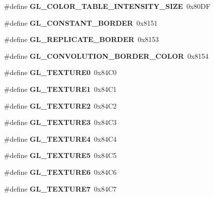 \begin{DoxyCompactItemize}
\item 
\#define {\bfseries G\+L\+\_\+\+C\+O\+L\+O\+R\+\_\+\+T\+A\+B\+L\+E\+\_\+\+I\+N\+T\+E\+N\+S\+I\+T\+Y\+\_\+\+S\+I\+Z\+E}~0x80\+D\+F\label{_s_d_l__opengl_8h_a4a290871d9e2f9022dd8e964d78bdbdb}

\item 
\#define {\bfseries G\+L\+\_\+\+C\+O\+N\+S\+T\+A\+N\+T\+\_\+\+B\+O\+R\+D\+E\+R}~0x8151\label{_s_d_l__opengl_8h_a753677dedf883b38fa6c5502b17c4e93}

\item 
\#define {\bfseries G\+L\+\_\+\+R\+E\+P\+L\+I\+C\+A\+T\+E\+\_\+\+B\+O\+R\+D\+E\+R}~0x8153\label{_s_d_l__opengl_8h_aa9566ae6ab500f9fcc95d0a0a95d7b2c}

\item 
\#define {\bfseries G\+L\+\_\+\+C\+O\+N\+V\+O\+L\+U\+T\+I\+O\+N\+\_\+\+B\+O\+R\+D\+E\+R\+\_\+\+C\+O\+L\+O\+R}~0x8154\label{_s_d_l__opengl_8h_a161f3ba1898cd146f31651c741d8daa7}

\item 
\#define {\bfseries G\+L\+\_\+\+T\+E\+X\+T\+U\+R\+E0}~0x84\+C0\label{_s_d_l__opengl_8h_a16cc91096144fc7048b45e2add14915b}

\item 
\#define {\bfseries G\+L\+\_\+\+T\+E\+X\+T\+U\+R\+E1}~0x84\+C1\label{_s_d_l__opengl_8h_a171671ae6383113df51b846373930771}

\item 
\#define {\bfseries G\+L\+\_\+\+T\+E\+X\+T\+U\+R\+E2}~0x84\+C2\label{_s_d_l__opengl_8h_a0058cf020ea54103d5533abcb2d6899c}

\item 
\#define {\bfseries G\+L\+\_\+\+T\+E\+X\+T\+U\+R\+E3}~0x84\+C3\label{_s_d_l__opengl_8h_a030cbee394ac326b01e35753a7fba1fd}

\item 
\#define {\bfseries G\+L\+\_\+\+T\+E\+X\+T\+U\+R\+E4}~0x84\+C4\label{_s_d_l__opengl_8h_a1f7d1f6b7274d0ad760d5c9bd83393e9}

\item 
\#define {\bfseries G\+L\+\_\+\+T\+E\+X\+T\+U\+R\+E5}~0x84\+C5\label{_s_d_l__opengl_8h_a7b22a0e4f5a5b887ff14d8a53ea31524}

\item 
\#define {\bfseries G\+L\+\_\+\+T\+E\+X\+T\+U\+R\+E6}~0x84\+C6\label{_s_d_l__opengl_8h_adb5131f23766351a34d36c0668d1e4de}

\item 
\#define {\bfseries G\+L\+\_\+\+T\+E\+X\+T\+U\+R\+E7}~0x84\+C7\label{_s_d_l__opengl_8h_a0f11172d6d2daa661bdb02545dff3644}


\end{DoxyCompactItemize}
